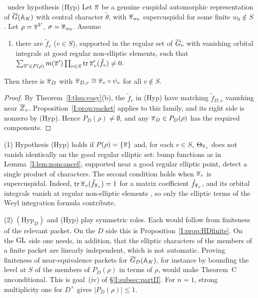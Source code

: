 \begin{theorem}[Converse]\label{I:thm:converse}\ under hypothesis (Hyp)
Let $\overline{\pi}$ be a genuine cuspidal automorphic representation of $\overline{G}(\mathbb{A}_K)$ with central character $\tilde\theta$, with $\overline{\pi}_{w_0}$ supercuspidal for some finite $w_0\notin S$. Let $\rho=\overline{\pi}^V$, $\sigma=\overline{\pi}_{w_0}$. Assume
\begin{enumerate}[label=(Hyp)]
\item there are $\tilde f_v$ ($v\in S$), supported in the regular set of $\overline{G}_v$ with vanishing orbital integrals at good regular non-elliptic elements, such that $\sum_{\overline{\pi}'\in P(\rho)}m(\overline{\pi}')\prod_{v\in S}\operatorname{tr}\overline{\pi}'_v(\tilde f_v)\ne0$.
\end{enumerate}
Then there is $\overline{\pi}_D$ with $\overline{\pi}_{D,v}\cong\overline{\pi}_v\circ\psi_v$ for all $v\notin S$.
\end{theorem}
\begin{proof}
By Theorem~\ref{I:thm:easy}(b), the $\tilde f_v$ in (Hyp) have matching $\tilde f_{D,v}$ vanishing near $\overline{Z}_v$. Proposition~\ref{I:prop:packet} applies to this family, and its right side is nonzero by (Hyp). Hence $P_D(\rho)\ne\emptyset$, and any $\overline{\pi}_D\in P_D(\rho)$ has the required components.
\end{proof}

\begin{remark}\label{I:rem:H}
(1) Hypothesis (Hyp) holds if $P(\rho)=\{\overline{\pi}\}$ and, for each $v\in S$, $\Theta_{\overline{\pi}_v}$ does not vanish identically on the good regular elliptic set: bump functions as in Lemma~\ref{I:lem:noncancel}, supported near a good regular elliptic point, detect a single product of characters. The second condition holds when $\overline{\pi}_v$ is supercuspidal. Indeed, $\operatorname{tr}\overline{\pi}_v(\tilde f_{\overline{\pi}_v})=1$ for a matrix coefficient $\tilde f_{\overline{\pi}_v}$, and its orbital integrals vanish at regular non-elliptic elements \cite[\S13(i)]{FK86}, so only the elliptic terms of the Weyl integration formula contribute.

(2) $(\mathrm{Hyp}_D)$ and (Hyp) play symmetric roles. Each would follow from finiteness of the relevant packet. On the $D$ side this is Proposition~\ref{I:prop:HDfinite}. On the $\mathrm{GL}$ side one needs, in addition, that the elliptic characters of the members of a finite packet are linearly independent, which is not automatic. Proving finiteness of near-equivalence packets for $\overline{G}_D(\mathbb{A}_K)$, for instance by bounding the level at $S$ of the members of $P_D(\rho)$ in terms of $\rho$, would make Theorem~C unconditional. This is goal~(iv) of \S\ref{I:subsec:partII}. For $n=1$, strong multiplicity one for $D^\times$ \cite{Bad08} gives $|P_D(\rho)|\le1$.
\end{remark}

